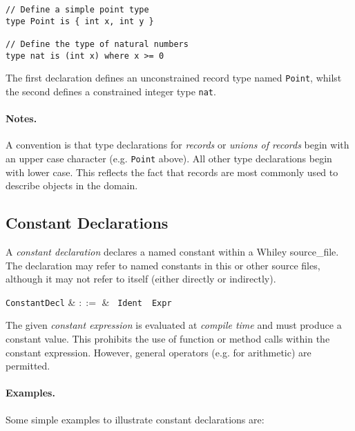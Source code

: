 \begin{lstlisting}
// Define a simple point type
type Point is { int x, int y }

// Define the type of natural numbers
type nat is (int x) where x >= 0
\end{lstlisting}

The first declaration defines an unconstrained record type named
\lstinline{Point}, whilst the second defines a constrained integer
type \lstinline{nat}.

\paragraph{Notes.}  A convention is that type declarations for {\em
  records} or {\em unions of records} begin with an upper case
character (e.g. \lstinline{Point} above).  All other type declarations
begin with lower case.  This reflects the fact that records are most
commonly used to describe objects in the domain.


\subsection{Constant Declarations}
\label{c_source_files_constant_decl}

A {\em constant declaration} declares a named constant within a Whiley \gls{source_file}.  The declaration may refer to named constants in this or other source files, although it may not refer to itself (either directly or indirectly).

\begin{syntax}
  \verb+ConstantDecl+ & $::=$ & \ \verb+Ident+\
  \ \verb+Expr+\\
\end{syntax}

The given {\em constant expression} is evaluated at {\em compile time}
and must produce a constant value.  This prohibits the use of function
or method calls within the constant expression.  However, general
operators (e.g. for arithmetic) are permitted.

\paragraph{Examples.}  Some simple examples to illustrate constant declarations are:

